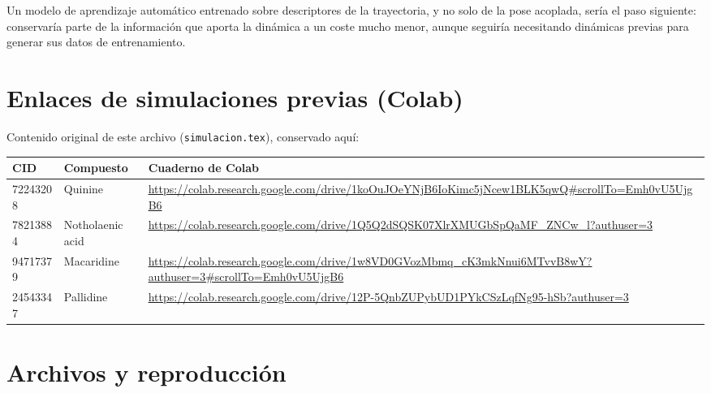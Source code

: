 \documentclass[11pt,a4paper]{article}
\begin{document}
Un modelo de aprendizaje automático entrenado sobre descriptores de la
trayectoria, y no solo de la pose acoplada, sería el paso siguiente: conservaría
parte de la información que aporta la dinámica a un coste mucho menor, aunque
seguiría necesitando dinámicas previas para generar sus datos de entrenamiento.


\appendix
\section{Enlaces de simulaciones previas (Colab)}

Contenido original de este archivo (\texttt{simulacion.tex}), conservado aquí:

\begin{table}[H]
\centering\small
\begin{tabular}{@{}l l p{10.4cm}@{}}
\toprule
CID & Compuesto & Cuaderno de Colab \\
\midrule
72243208 & Quinine & \url{https://colab.research.google.com/drive/1koOuJOeYNjB6IoKimc5jNcew1BLK5qwQ#scrollTo=Emh0vU5UjgB6} \\
78213884 & Notholaenic acid & \url{https://colab.research.google.com/drive/1Q5Q2dSQSK07XlrXMUGbSpQaMF_ZNCw_l?authuser=3} \\
94717379 & Macaridine & \url{https://colab.research.google.com/drive/1w8VD0GVozMbmq_cK3mkNnui6MTvvB8wY?authuser=3#scrollTo=Emh0vU5UjgB6} \\
24543347 & Pallidine & \url{https://colab.research.google.com/drive/12P-5QnbZUPybUD1PYkCSzLqfNg95-hSb?authuser=3} \\
\bottomrule
\end{tabular}
\end{table}

\section{Archivos y reproducción}
\end{document}
